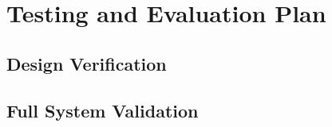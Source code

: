 
\section{Testing and Evaluation Plan}
\label{sec:te_plan}

\subsection{Design Verification}
\label{sec:verification}









\subsection{Full System Validation}
\label{sec:system_validation}
